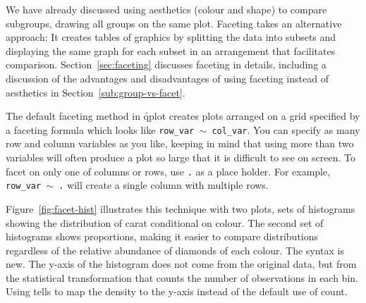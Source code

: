 We have already discussed using aesthetics (colour and shape) to compare subgroups, drawing all groups on the same plot. Faceting takes an alternative approach: It creates tables of graphics by splitting the data into subsets and displaying the same graph for each subset in an arrangement that facilitates comparison. Section~\ref{sec:faceting} discusses faceting in details, including a discussion of the advantages and disadvantages of using faceting instead of aesthetics in Section~\ref{sub:group-vs-facet}.

The default faceting method in \f{qplot} creates plots arranged on a grid specified by a faceting formula which looks like {\tt row\_var $\sim$ col\_var}.  You can specify as many row and column variables as you like, keeping in mind that using more than two variables will often produce a plot so large that it is difficult to see on screen.  To facet on only one of columns or rows, use {\tt .} as a place holder.  For example, {\tt row\_var $\sim$ .} will create a single column with multiple rows.


Figure~\ref{fig:facet-hist} illustrates this technique with two plots, sets of histograms showing the distribution of carat conditional on colour.
The second set of histograms shows proportions, making it easier to compare distributions regardless of the relative abundance of diamonds of each colour. The  syntax is new. The y-axis of the histogram does not come from the original data, but from the statistical transformation that counts the number of observations in each bin.  Using  tells \ggplot to map the density to the y-axis instead of the default use of count.  

% 


